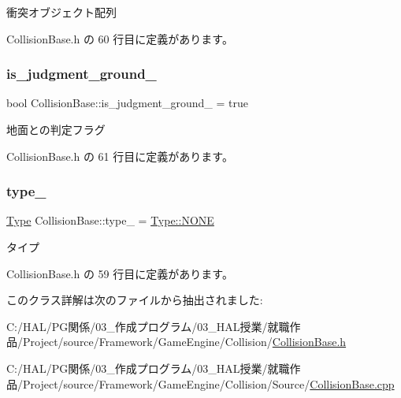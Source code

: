 衝突オブジェクト配列 



 Collision\+Base.\+h の 60 行目に定義があります。

\mbox{\label{class_collision_base_acc56eed7a6366d77bb2b80810f0a4ea7}} 
\subsubsection{\texorpdfstring{is\+\_\+judgment\+\_\+ground\+\_\+}{is\_judgment\_ground\_}}
{\footnotesize\ttfamily bool Collision\+Base\+::is\+\_\+judgment\+\_\+ground\+\_\+ = true\hspace{0.3cm}{\ttfamily [private]}}



地面との判定フラグ 



 Collision\+Base.\+h の 61 行目に定義があります。

\mbox{\label{class_collision_base_a254487778b15b900d763ebf0bf153c3e}} 
\subsubsection{\texorpdfstring{type\+\_\+}{type\_}}
{\footnotesize\ttfamily \mbox{\hyperlink{class_collision_base_a18dc0d5461742083ca12013fe9ff1a20}{Type}} Collision\+Base\+::type\+\_\+ = \mbox{\hyperlink{class_collision_base_a18dc0d5461742083ca12013fe9ff1a20ab50339a10e1de285ac99d4c3990b8693}{Type\+::\+N\+O\+NE}}\hspace{0.3cm}{\ttfamily [private]}}



タイプ 



 Collision\+Base.\+h の 59 行目に定義があります。



このクラス詳解は次のファイルから抽出されました\+:\begin{DoxyCompactItemize}
\item 
C\+:/\+H\+A\+L/\+P\+G関係/03\+\_\+作成プログラム/03\+\_\+\+H\+A\+L授業/就職作品/\+Project/source/\+Framework/\+Game\+Engine/\+Collision/\mbox{\hyperlink{_collision_base_8h}{Collision\+Base.\+h}}\item 
C\+:/\+H\+A\+L/\+P\+G関係/03\+\_\+作成プログラム/03\+\_\+\+H\+A\+L授業/就職作品/\+Project/source/\+Framework/\+Game\+Engine/\+Collision/\+Source/\mbox{\hyperlink{_collision_base_8cpp}{Collision\+Base.\+cpp}}\end{DoxyCompactItemize}
